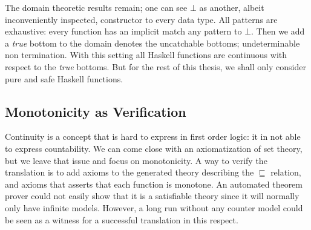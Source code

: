The domain theoretic results remain; one can see $\bot$ as another,
albeit inconveniently inspected, constructor to every data type. All
patterns are exhaustive: every function has an implicit match any
pattern to $\bot$.  Then we add a \emph{true} bottom to the domain
denotes the uncatchable bottoms; undeterminable non termination. With
this setting all Haskell functions are continuous with respect to the
\emph{true} bottoms. But for the rest of this thesis, we shall only
consider pure and safe Haskell functions.

\subsection{Monotonicity as Verification}

Continuity is a concept that is hard to express in first order logic:
it in not able to express countability. We can come close with an
axiomatization of set theory, but we leave that issue and focus on
monotonicity. A way to verify the translation is to add axioms to the
generated theory describing the $\sqsubseteq$ relation, and axioms
that asserts that each function is monotone. An automated theorem
prover could not easily show that it is a satisfiable theory since it
will normally only have infinite models. However, a long run without
any counter model could be seen as a witness for a successful
translation in this respect.
